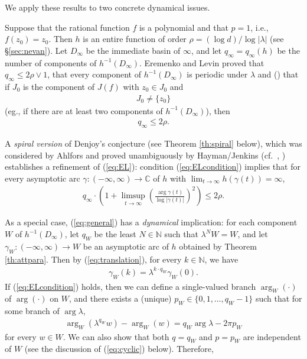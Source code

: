 \documentclass[a4paper,12pt]{amsart}
\theoremstyle{plain}
\theoremstyle{definition}
\theoremstyle{remark}
\numberwithin{equation}{section}
\begin{document}
We apply these results to two concrete dynamical issues.

{\smallskip {}\nopagebreak[4]}
Suppose that the rational function $f$ is a polynomial and
that $p=1$, i.e., $f(z_0)=z_0$. Then $h$ is an entire function
of order $\rho=(\log d)/\log|\lambda|$ (see \S \ref{sec:nevan}).
Let $D_{\infty}$ be the immediate basin of $\infty$,
and let $q_{\infty}=q_{\infty}(h)$ be the number of components of $h^{-1}(D_{\infty})$.
Eremenko and Levin \cite{EremenkoLevin89} proved that $q_{\infty}\le 2\rho\vee 1$,
that every component of $h^{-1}(D_{\infty})$ is periodic under $\lambda$ and
(\cite[p.\ 1260]{EremenkoLevin89}) that
if $J_0$ is the component of $J(f)$ with $z_0\in J_0$ and
\begin{gather}
 J_0\neq\{z_0\}\tag{EL}\label{eq:ELcondition}
\end{gather}
(eg., if there are at least two components of $h^{-1}(D_{\infty})$), then
\begin{gather}
 q_{\infty}\le 2\rho.\label{eq:EL}
\end{gather}

A {\itshape spiral version} of Denjoy's conjecture (see Theorem \ref{th:spiral} below),
which was considered by Ahlfors \cite{Ahlfors30}
and proved unambiguously by Hayman/Jenkins
(cf.\ \cite[Theorem 8.21]{Hayman89}, \cite{Jenkins87})
establishes a refinement of (\ref{eq:EL}):
condition (\ref{eq:ELcondition}) implies that
for every asymptotic arc $\gamma:(-\infty,\infty)\to{\mathbb{C}}$ of $h$
with $\lim_{t\to\infty}h(\gamma(t))=\infty$,
\begin{gather}
 q_{\infty}\cdot\left(1+\limsup_{t\to\infty}\left(\frac{\arg\gamma(t)}{\log|\gamma(t)|}\right)^2\right)\le 2\rho.\label{eq:general}
\end{gather}

As a special case, (\ref{eq:general}) has a {\itshape dynamical} implication:
for each component $W$ of $h^{-1}(D_{\infty})$,
let $q_W$ be the least $N\in{\mathbb{N}}$ such that $\lambda^NW=W$, and
let $\gamma_W:(-\infty,\infty)\to W$ be an asymptotic arc of $h$ 
obtained by Theorem \ref{th:attpara}.
Then by (\ref{eq:translation}), for every $k\in{\mathbb{N}}$, we have
\begin{gather}
 \gamma_W(k)=\lambda^{k\cdot q_W}\gamma_W(0).\label{eq:orbits}
\end{gather}
If (\ref{eq:ELcondition}) holds, then
we can define a single-valued branch $\arg_W(\cdot)$ of $\arg(\cdot)$ on $W$,
and there exists a (unique) $p_W\in\{0,1,\ldots,q_W-1\}$
such that for some branch of $\arg\lambda$,
\begin{gather}
 \arg_W(\lambda^{q_W}w)-\arg_W(w)=q_W\arg\lambda-2\pi p_W\label{eq:argument}
\end{gather}
for every $w\in W$. We can also show that both $q=q_W$ and $p=p_W$ are independent of $W$
(see the discussion of (\ref{eq:cyclic}) below). Therefore,
\end{document}
